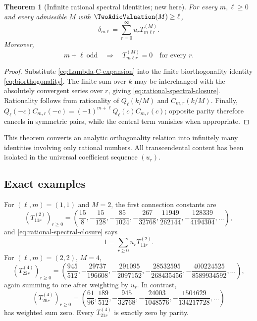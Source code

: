 \documentclass[11pt,oneside]{article}
\numberwithin{equation}{section}
\newtheorem{theorem}{Theorem}[section]
\theoremstyle{definition}
\theoremstyle{remark}
\begin{document}
\begin{theorem}[Infinite rational spectral identities; new here]
\label{thm:rational-spectral-closure}
For every $m,\ell\ge0$ and every admissible $M$ with
$\TwoAdicValuation(M)\ge\ell$,
\begin{equation}
 \boxed{
 \delta_{m\ell}=\sum_{r=0}^{\infty}u_rT_{m\ell r}^{(M)}.}
 \label{eq:rational-spectral-closure}
\end{equation}
Moreover,
\begin{equation}
 m+\ell\ \text{odd}
 \quad\Longrightarrow\quad
 T_{m\ell r}^{(M)}=0
 \quad\text{for every }r.
 \label{eq:T-parity-zero}
\end{equation}
\end{theorem}

\begin{proof}
Substitute \eqref{eq:Lambda-C-expansion} into the finite biorthogonality
identity \eqref{eq:biorthogonality}.  The finite sum over $k$ may be
interchanged with the absolutely convergent series over $r$, giving
\eqref{eq:rational-spectral-closure}.  Rationality follows from rationality of
$Q_\ell(k/M)$ and $C_{m,r}(k/M)$.  Finally,
$Q_\ell(-c)C_{m,r}(-c)=(-1)^{m+\ell}Q_\ell(c)C_{m,r}(c)$;
opposite parity therefore cancels in symmetric pairs, while the central term
vanishes when appropriate.
\end{proof}

This theorem converts an analytic orthogonality relation into infinitely many
identities involving only rational numbers.  All transcendental content has
been isolated in the universal coefficient sequence $(u_r)$.

\subsection{Exact examples}

For $(\ell,m)=(1,1)$ and $M=2$, the first connection constants are
\begin{equation}
 \left(T_{11r}^{(2)}\right)_{r\ge0}=
 \left(
 \frac{15}{8},
 -\frac{15}{128},
 -\frac{85}{1024},
 -\frac{267}{32768},
 \frac{11949}{262144},
 -\frac{128339}{4194304},
 \ldots\right),
 \label{eq:T11-values}
\end{equation}
and \eqref{eq:rational-spectral-closure} says
\begin{equation}
 1=\sum_{r\ge0}u_rT_{11r}^{(2)}.
 \label{eq:T11-identity}
\end{equation}
For $(\ell,m)=(2,2)$, $M=4$,
\begin{equation}
 \left(T_{22r}^{(4)}\right)_{r\ge0}=
 \left(
 \frac{945}{512},
 -\frac{29737}{196608},
 -\frac{291095}{2097152},
 -\frac{28532595}{268435456},
 -\frac{400224525}{8589934592},
 \ldots\right),
 \label{eq:T22-values}
\end{equation}
again summing to one after weighting by $u_r$.  In contrast,
\begin{equation}
 \left(T_{20r}^{(4)}\right)_{r\ge0}=
 \left(
 \frac{61}{96},
 \frac{189}{512},
 -\frac{945}{32768},
 -\frac{24003}{1048576},
 -\frac{1504629}{134217728},
 \ldots\right)
 \label{eq:T20-values}
\end{equation}
has weighted sum zero.  Every $T_{21r}^{(4)}$ is exactly zero by parity.
\end{document}
